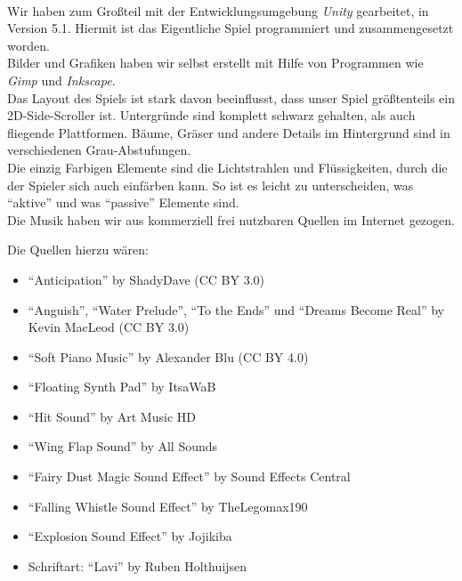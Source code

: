\documentclass[10pt,a4paper,notitlepage]{report}
\begin{document}
	\\\par\medskip\Text
	Wir haben zum Großteil mit der Entwicklungsumgebung \textit{Unity} gearbeitet, in Version 5.1. Hiermit ist das Eigentliche Spiel programmiert und zusammengesetzt worden.\\
	Bilder und Grafiken haben wir selbst erstellt mit Hilfe von Programmen wie \textit{Gimp} und \textit{Inkscape}.\\
	Das Layout des Spiels ist stark davon beeinflusst, dass unser Spiel größtenteils ein 2D-Side-Scroller ist. Untergründe sind komplett schwarz gehalten, als auch fliegende Plattformen. Bäume, Gräser und andere Details im Hintergrund sind in verschiedenen Grau-Abstufungen.\\
	Die einzig Farbigen Elemente sind die Lichtstrahlen und Flüssigkeiten, durch die der Spieler sich auch einfärben kann. So ist es leicht zu unterscheiden, was \enquote{aktive} und was \enquote{passive} Elemente sind.\\
	Die Musik haben wir aus kommerziell frei nutzbaren Quellen im Internet gezogen.\\\par\smallskip
	Die Quellen hierzu wären:\\
	\begin{itemize}
		\item \enquote{Anticipation} by ShadyDave (CC BY 3.0)
		\item \enquote{Anguish}, \enquote{Water Prelude}, \enquote{To the Ends} und \enquote{Dreams Become Real} by Kevin MacLeod (CC BY 3.0)
		\item \enquote{Soft Piano Music} by Alexander Blu (CC BY 4.0)
		\item \enquote{Floating Synth Pad} by ItsaWaB
		\item \enquote{Hit Sound} by Art Music HD
		\item \enquote{Wing Flap Sound} by All Sounds
		\item \enquote{Fairy Dust Magic Sound Effect} by Sound Effects Central
		\item \enquote{Falling Whistle Sound Effect} by TheLegomax190
		\item \enquote{Explosion Sound Effect} by Jojikiba
		\item Schriftart: \enquote{Lavi} by Ruben Holthuijsen
	\end{itemize}
	
	\clearpage
	\marginpar{\vspace{3.0mm} \color{orange}\rule{0.8mm}{53.3mm} \\[3mm] \color{hellorange}\rule{0.8mm}{170mm}}
	\par\bigskip
\end{document}
